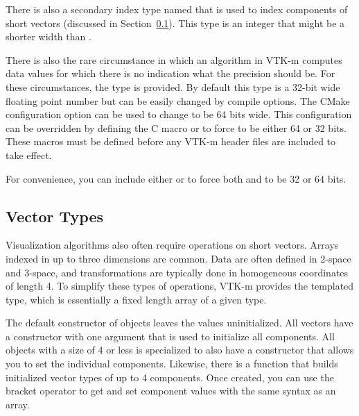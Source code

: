 There is also a secondary index type named  that is used
to index components of short vectors (discussed in
Section~\ref{sec:VectorTypes}). This type is an integer that might be a
shorter width than .

There is also the rare circumstance in which an algorithm in VTK-m computes
data values for which there is no indication what the precision should
be. For these circumstances, the type  is provided. By
default this type is a 32-bit wide floating point number but can be easily
changed by compile options. The CMake configuration option
 can be used to change
 to be 64 bits wide. This configuration can be
overridden by defining the C macro 
or  to force  to
be either 64 or 32 bits. These macros must be defined before any VTK-m
header files are included to take
effect.

For convenience, you can include either
 or
 to force both  and
 to be 32 or 64 bits.

\subsection{Vector Types}
\label{sec:VectorTypes}

Visualization algorithms also often require operations on short vectors.
Arrays indexed in up to three dimensions are common. Data are often defined
in 2-space and 3-space, and transformations are typically done in
homogeneous coordinates of length 4. To simplify these types of operations,
VTK-m provides the  templated type, which is
essentially a fixed length array of a given type.

The default constructor of  objects leaves the values
uninitialized. All vectors have a constructor with one argument that is
used to initialize all components. All  objects with a size of 4
or less is specialized to also have a constructor that allows you to set
the individual components. Likewise, there is a  function
that builds initialized vector types of up to 4 components. Once created,
you can use the bracket operator to get and set component values with the
same syntax as an array.


